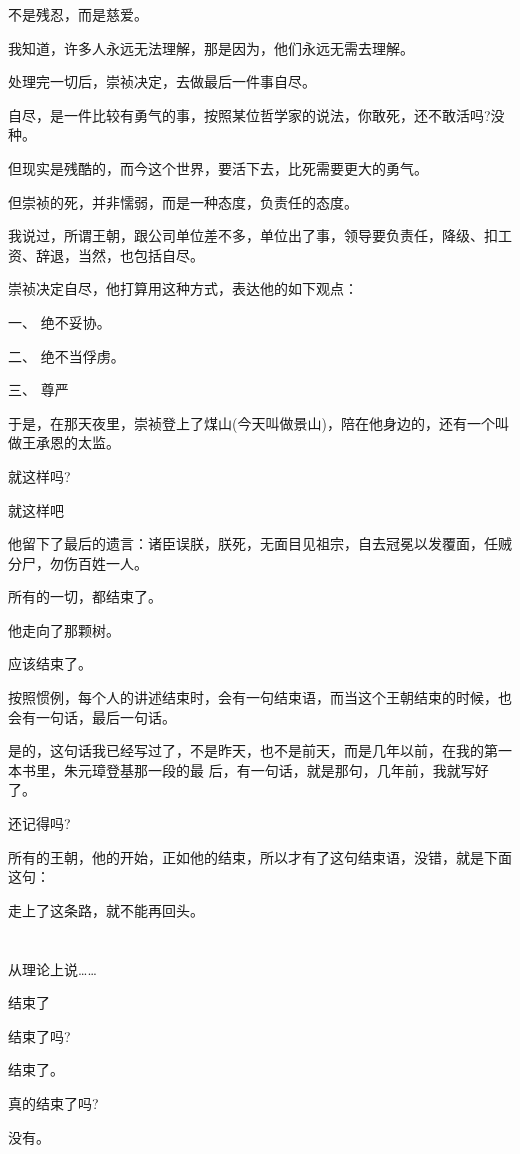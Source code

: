 \documentclass[11pt,a4paper,onecolumn]{article}
\begin{document}
不是残忍，而是慈爱。

我知道，许多人永远无法理解，那是因为，他们永远无需去理解。

处理完一切后，崇祯决定，去做最后一件事\myrule 自尽。

自尽，是一件比较有勇气的事，按照某位哲学家的说法，你敢死，还不敢活吗?没种。

但现实是残酷的，而今这个世界，要活下去，比死需要更大的勇气。

但崇祯的死，并非懦弱，而是一种态度，负责任的态度。

我说过，所谓王朝，跟公司单位差不多，单位出了事，领导要负责任，降级、扣工资、辞退，当然，也包括自尽。

崇祯决定自尽，他打算用这种方式，表达他的如下观点：

一、 绝不妥协。

二、 绝不当俘虏。

三、 尊严

于是，在那天夜里，崇祯登上了煤山(今天叫做景山)，陪在他身边的，还有一个叫做王承恩的太监。

就这样吗?

就这样吧

他留下了最后的遗言：诸臣误朕，朕死，无面目见祖宗，自去冠冕以发覆面，任贼分尸，勿伤百姓一人。

所有的一切，都结束了。

他走向了那颗树。

应该结束了。

按照惯例，每个人的讲述结束时，会有一句结束语，而当这个王朝结束的时候，也会有一句话，最后一句话。

是的，这句话我已经写过了，不是昨天，也不是前天，而是几年以前，在我的第一本书里，朱元璋登基那一段的最
后，有一句话，就是那句，几年前，我就写好了。

还记得吗?

所有的王朝，他的开始，正如他的结束，所以才有了这句结束语，没错，就是下面这句：

走上了这条路，就不能再回头。

\section[\thesection]{}

从理论上说……

结束了

结束了吗?

结束了。

真的结束了吗?

没有。
\end{document}
